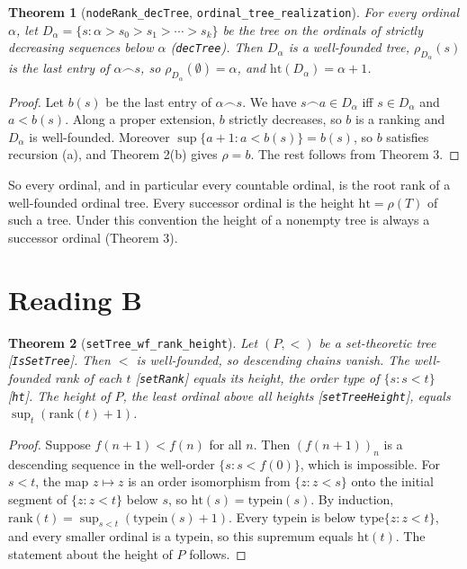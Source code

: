 \documentclass[11pt]{article}
\newtheorem{theorem}{Theorem}
\theoremstyle{definition}
\begin{document}
\begin{theorem}[\texttt{nodeRank\_decTree}, \texttt{ordinal\_tree\_realization}]
For every ordinal $\alpha$, let $D_\alpha=\{s:\alpha>s_0>s_1>\cdots>s_k\}$ be the tree on the ordinals
of strictly decreasing sequences below $\alpha$ (\texttt{decTree}). Then $D_\alpha$ is a
well-founded tree, $\rho_{D_\alpha}(s)$ is the last entry of $\alpha\frown s$, so
$\rho_{D_\alpha}(\emptyset)=\alpha$, and $\mathrm{ht}(D_\alpha)=\alpha+1$.
\end{theorem}
\begin{proof}
Let $b(s)$ be the last entry of $\alpha\frown s$. We have $s\frown a\in D_\alpha$ iff $s\in D_\alpha$
and $a<b(s)$. Along a proper extension, $b$ strictly decreases, so $b$ is a ranking and $D_\alpha$ is
well-founded. Moreover $\sup\{a+1:a<b(s)\}=b(s)$, so $b$ satisfies recursion (a), and Theorem 2(b)
gives $\rho=b$. The rest follows from Theorem 3.
\end{proof}
So every ordinal, and in particular every countable ordinal, is the root rank of a well-founded
ordinal tree. Every successor ordinal is the height $\mathrm{ht}=\rho(T)$ of such a tree. Under this
convention the height of a nonempty tree is always a successor ordinal (Theorem 3).

\section{Reading B}
\begin{theorem}[\texttt{setTree\_wf\_rank\_height}]
Let $(P,<)$ be a set-theoretic tree [\texttt{IsSetTree}]. Then $<$ is well-founded, so descending
chains vanish. The well-founded rank of each $t$ [\texttt{setRank}] equals its height, the order type
of $\{s:s<t\}$ [\texttt{ht}]. The height of $P$, the least ordinal above all heights
[\texttt{setTreeHeight}], equals $\sup_t(\mathrm{rank}(t)+1)$.
\end{theorem}
\begin{proof}
Suppose $f(n+1)<f(n)$ for all $n$. Then $(f(n+1))_n$ is a descending sequence in the well-order
$\{s:s<f(0)\}$, which is impossible. For $s<t$, the map $z\mapsto z$ is an order isomorphism from
$\{z:z<s\}$ onto the initial segment of $\{z:z<t\}$ below $s$, so $\mathrm{ht}(s)=\mathrm{typein}(s)$.
By induction,
$\mathrm{rank}(t)=\sup_{s<t}(\mathrm{typein}(s)+1)$. Every typein is below $\mathrm{type}\{z:z<t\}$,
and every smaller ordinal is a typein, so this supremum equals $\mathrm{ht}(t)$. The statement about
the height of $P$ follows.
\end{proof}
\end{document}
